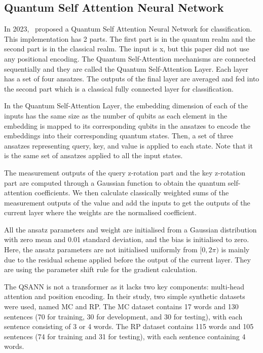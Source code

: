 \subsection{Quantum Self Attention Neural Network}
\label{subsec:quantum_self_attention_neural_network}
In 2023,~\citet{li2023quantum} proposed a Quantum Self Attention
Neural Network for classification. This implementation has 2 parts.
The first part is in the quantum realm and the second part is in the
classical realm. The input is x, but this paper did not use any
positional encoding. The Quantum Self-Attention mechanisms are
connected sequentially and they are called the Quantum Self-Attention
Layer. Each layer has a set of four ansatzes. The outputs of the
final layer are averaged and fed into the second part which is a
classical fully connected layer for classification.

In the Quantum Self-Attention Layer, the embedding dimension of each
of the inputs has the same size as the number of qubits as each
element in the embedding is mapped to its corresponding qubits in the
ansatzes to encode the embeddings into their corresponding quantum
states. Then, a set of three ansatzes representing query, key, and
value is applied to each state. Note that it is the same set of
ansatzes applied to all the input states.

The measurement outputs of the query z-rotation part and the key
z-rotation part are computed through a Gaussian function to obtain
the quantum self-attention coefficients. We then calculate
classically weighted sums of the measurement outputs of the value and
add the inputs to get the outputs of the current layer where the
weights are the normalised coefficient.

All the ansatz parameters and weight are initialised from a Gaussian
distribution with zero mean and 0.01 standard deviation, and the bias
is initialised to zero. Here, the ansatz parameters are not
initialised uniformly from \([0, 2\pi)\) is mainly due to the
residual scheme applied before the output of the current layer. They
are using the parameter shift rule for the gradient calculation.

The QSANN is not a transformer as it lacks two key components:
multi-head attention and position encoding. In their study, two
simple synthetic datasets were used, named MC and RP. The MC dataset
contains 17 words and 130 sentences (70 for training, 30 for
development, and 30 for testing), with each sentence consisting of 3
or 4 words. The RP dataset contains 115 words and 105 sentences (74
for training and 31 for testing), with each sentence containing 4 words.

